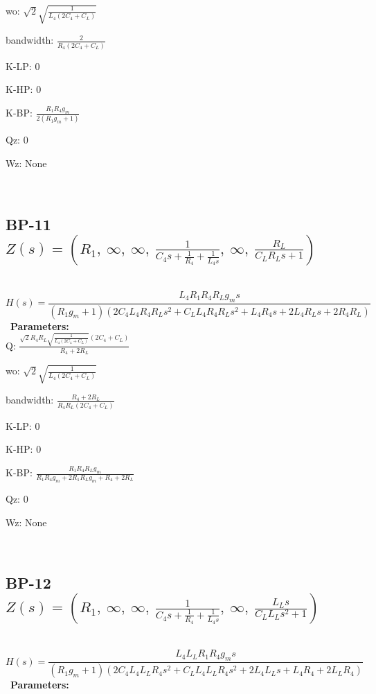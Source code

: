 \documentclass{article}
\begin{document}
wo: $\sqrt{2} \sqrt{\frac{1}{L_{4} \left(2 C_{4} + C_{L}\right)}}$\ 

bandwidth: $\frac{2}{R_{4} \left(2 C_{4} + C_{L}\right)}$\ 

K-LP: $0$\ 

K-HP: $0$\ 

K-BP: $\frac{R_{1} R_{4} g_{m}}{2 \left(R_{1} g_{m} + 1\right)}$\ 

Qz: $0$\ 

Wz: $\text{None}$\ 

\ 

\subsection{BP-11 $Z(s) = \left( R_{1}, \  \infty, \  \infty, \  \frac{1}{C_{4} s + \frac{1}{R_{4}} + \frac{1}{L_{4} s}}, \  \infty, \  \frac{R_{L}}{C_{L} R_{L} s + 1}\right)$ } \ 
\textbf{\[H(s) = \frac{L_{4} R_{1} R_{4} R_{L} g_{m} s}{\left(R_{1} g_{m} + 1\right) \left(2 C_{4} L_{4} R_{4} R_{L} s^{2} + C_{L} L_{4} R_{4} R_{L} s^{2} + L_{4} R_{4} s + 2 L_{4} R_{L} s + 2 R_{4} R_{L}\right)}\] } \ 
\textbf{Parameters:}\\ 

Q: $\frac{\sqrt{2} R_{4} R_{L} \sqrt{\frac{1}{L_{4} \left(2 C_{4} + C_{L}\right)}} \left(2 C_{4} + C_{L}\right)}{R_{4} + 2 R_{L}}$\ 

wo: $\sqrt{2} \sqrt{\frac{1}{L_{4} \left(2 C_{4} + C_{L}\right)}}$\ 

bandwidth: $\frac{R_{4} + 2 R_{L}}{R_{4} R_{L} \left(2 C_{4} + C_{L}\right)}$\ 

K-LP: $0$\ 

K-HP: $0$\ 

K-BP: $\frac{R_{1} R_{4} R_{L} g_{m}}{R_{1} R_{4} g_{m} + 2 R_{1} R_{L} g_{m} + R_{4} + 2 R_{L}}$\ 

Qz: $0$\ 

Wz: $\text{None}$\ 

\ 

\subsection{BP-12 $Z(s) = \left( R_{1}, \  \infty, \  \infty, \  \frac{1}{C_{4} s + \frac{1}{R_{4}} + \frac{1}{L_{4} s}}, \  \infty, \  \frac{L_{L} s}{C_{L} L_{L} s^{2} + 1}\right)$ } \ 
\textbf{\[H(s) = \frac{L_{4} L_{L} R_{1} R_{4} g_{m} s}{\left(R_{1} g_{m} + 1\right) \left(2 C_{4} L_{4} L_{L} R_{4} s^{2} + C_{L} L_{4} L_{L} R_{4} s^{2} + 2 L_{4} L_{L} s + L_{4} R_{4} + 2 L_{L} R_{4}\right)}\] } \ 
\textbf{Parameters:}\\ 
\end{document}
